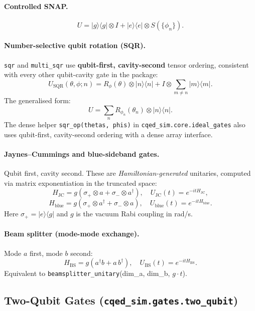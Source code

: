 \documentclass[11pt]{article}
\begin{document}
\paragraph{Controlled SNAP.}
\[
  U = |g\rangle\langle g|\otimes I
    + |e\rangle\langle e|\otimes S(\{\phi_n\}).
\]

\paragraph{Number-selective qubit rotation (SQR).}
\texttt{sqr} and \texttt{multi\_sqr} use \textbf{qubit-first, cavity-second}
tensor ordering, consistent with every other qubit-cavity gate in the package:
\[
  U_\text{SQR}(\theta,\phi;n)
  = R_\phi(\theta)\otimes|n\rangle\langle n|
  + I\otimes\sum_{m\neq n}|m\rangle\langle m|.
\]
The generalised form:
\[
  U = \sum_n R_{\phi_n}(\theta_n)\otimes|n\rangle\langle n|.
\]
The dense helper \texttt{sqr\_op(thetas, phis)} in \texttt{cqed\_sim.core.ideal\_gates}
also uses qubit-first, cavity-second ordering with a dense array interface.

\paragraph{Jaynes--Cummings and blue-sideband gates.}
Qubit first, cavity second. These are \emph{Hamiltonian-generated} unitaries,
computed via matrix exponentiation in the truncated space:
\[
  H_\text{JC} = g\!\left(\sigma_+\otimes a + \sigma_-\otimes a^\dagger\right),\quad
  U_\text{JC}(t) = e^{-itH_\text{JC}},
\]
\[
  H_\text{blue} = g\!\left(\sigma_+\otimes a^\dagger + \sigma_-\otimes a\right),\quad
  U_\text{blue}(t) = e^{-itH_\text{blue}}.
\]
Here \(\sigma_+ = |e\rangle\langle g|\) and \(g\) is the vacuum Rabi coupling
in rad/s.

\paragraph{Beam splitter (mode-mode exchange).}
Mode \(a\) first, mode \(b\) second:
\[
  H_\text{BS} = g\!\left(a^\dagger b + a\,b^\dagger\right),\quad
  U_\text{BS}(t) = e^{-itH_\text{BS}}.
\]
Equivalent to \texttt{beamsplitter\_unitary}(dim\_a, dim\_b, \(g\cdot t\)).

\subsection{Two-Qubit Gates (\texttt{cqed\_sim.gates.two\_qubit})}
\label{subsec:two_qubit_gates}
\end{document}
